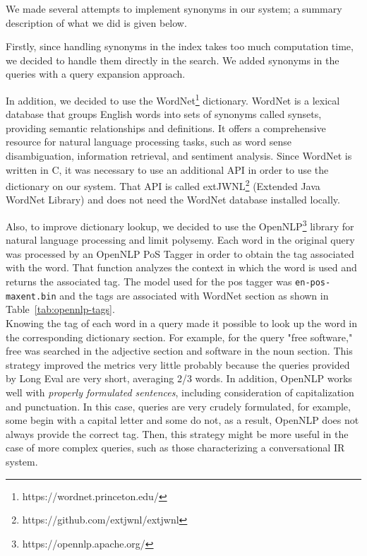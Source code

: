 We made several attempts to implement synonyms in our system; a summary description of what we did is given below.

Firstly, since handling synonyms in the index takes too much computation time, we decided to handle them directly in the search. We added synonyms in the queries with a query expansion approach.

In addition, we decided to use the WordNet\footnote{https://wordnet.princeton.edu/} dictionary. WordNet is a lexical database that groups English words into sets of synonyms called synsets, providing semantic relationships and definitions. It offers a comprehensive resource for natural language processing tasks, such as word sense disambiguation, information retrieval, and sentiment analysis.
Since WordNet is written in C, it was necessary to use an additional API in order to use the dictionary on our system. That API is called extJWNL\footnote{https://github.com/extjwnl/extjwnl} (Extended Java WordNet Library) and does not need the WordNet database installed locally.

Also, to improve dictionary lookup, we decided to use the OpenNLP\footnote{https://opennlp.apache.org/} library for natural language processing and limit polysemy. Each word in the original query was processed by an OpenNLP \ac{PoS} Tagger in order to obtain the tag associated with the word. That function analyzes the context in which the word is used and returns the associated tag. The model used for the pos tagger was \texttt{en-pos-maxent.bin} and the tags are associated with WordNet section as shown in Table~\ref{tab:opennlp-tags}.\\
Knowing the tag of each word in a query made it possible to look up the word in the corresponding dictionary section. For example, for the query "free software," free was searched in the adjective section and software in the noun section.
This strategy improved the metrics very little probably because the queries provided by Long Eval are very short, averaging 2/3 words. In addition, OpenNLP works well with \emph{properly formulated sentences}, including consideration of capitalization and punctuation. In this case, queries are very crudely formulated, for example, some begin with a capital letter and some do not, as a result, OpenNLP does not always provide the correct tag. Then, this strategy might be more useful in the case of more complex queries, such as those characterizing a conversational \ac{IR} system.

